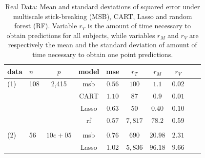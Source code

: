 \begin{table}[t]
\caption{Real Data: Mean and standard deviations of squared error under multiscale stick-breaking (MSB), CART, Lasso and random forest (RF).  Variable $r_{T}$ is the amount of time necessary to obtain predictions for all subjects, while variables $r_M$ and $r_V$ are respectively the mean and the standard deviation of amount of time necessary to obtain one point predictions.}\label{real}
\vskip 0.15in
\begin{center}
\begin{small}
\begin{sc}
\begin{tabular}{llcccccccc}
\hline
data &$n$&$p$ &model&mse&$r_{T}$ & $r_{M}$ & $r_{V}$\\
\hline
(1)&108&2,415&msb &$0.56$ & $100$ & $1.1$& $0.02$\\
 &&& CART & $1.10$ & $87$ & $0.9$ &$0.01$\\
&&& Lasso & $0.63$  & $50$ & $0.40$ & $0.10$\\
&&& rf & $0.57$ &  $7,817$ & $78.2$ & $0.59$\\
\\
  (2)&56&$10e+05$&msb &$0.76$ & $690$ & $20.98$& $2.31$\\
 &&& Lasso & $1.02$  & $5,836$ & $96.18$ & $9.66$\\
\hline
\end{tabular}
\end{sc}
\end{small}
\end{center}
\vskip -0.1in
\end{table}




 
 



